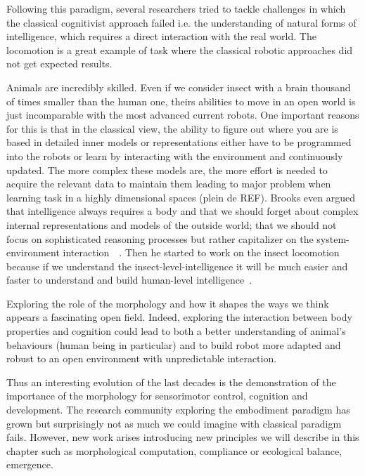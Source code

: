 Following this paradigm, several researchers tried to tackle challenges in which the classical cognitivist approach failed i.e. the understanding of natural forms of intelligence, which requires a direct interaction with the real world. The locomotion is a great example of task where the classical robotic approaches did not get expected results.

Animals are incredibly skilled. Even if we consider insect with a brain thousand of times smaller than the human one, theirs abilities to move in an open world is just incomparable with the most advanced current robots. One important reasons for this is that in the classical view, the ability to figure out where you are is based in detailed inner models or representations either have to be programmed into the robots or learn by interacting with the environment and continuously updated. The more complex these models are, the more effort is needed to acquire the relevant data to maintain them leading to major problem when learning task in a highly dimensional spaces (plein de REF). Brooks even argued that intelligence always requires a body and that we should forget about complex internal representations and models of the outside world; that we should not focus on sophisticated reasoning processes but rather capitalizer on the system-environment interaction~\cite{brooks1991intelligence}~\cite{brooks1995intelligence}. Then he started to work on the insect locomotion because if we understand the insect-level-intelligence it will be much easier and faster to understand and build human-level intelligence~\cite{brooks1996prospects}.


Exploring the role of the morphology and how it shapes the ways we think appears a fascinating open field. Indeed, exploring the interaction between body properties and cognition could lead to both a better understanding of animal's behaviours (human being in particular) and to build robot more adapted and robust to an open environment with unpredictable interaction.

Thus an interesting evolution of the last decades is the demonstration of the importance of the morphology for sensorimotor control, cognition and development. The research community exploring the embodiment paradigm has grown but surprisingly not as much we could imagine with classical paradigm fails. However, new work arises introducing new principles we will describe in this chapter such as morphological computation, compliance or ecological balance, emergence.

